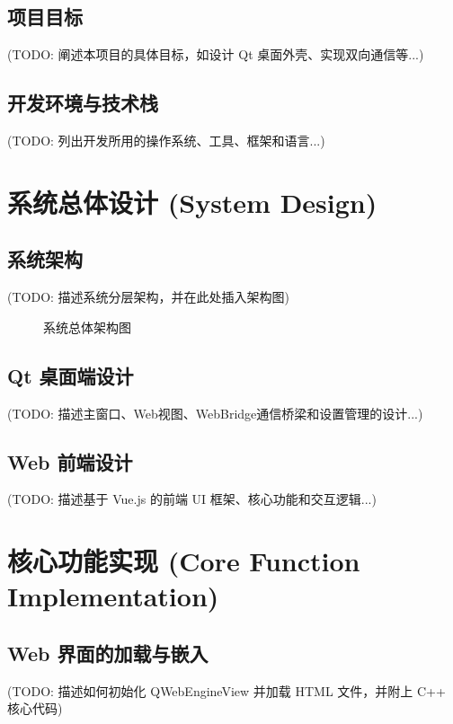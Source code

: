 \documentclass[12pt, a4paper]{article}
\begin{document}
	\subsection{项目目标}
	(TODO: 阐述本项目的具体目标，如设计 Qt 桌面外壳、实现双向通信等...)
	\subsection{开发环境与技术栈}
	(TODO: 列出开发所用的操作系统、工具、框架和语言...)
	
	\section{系统总体设计 (System Design)}
	\subsection{系统架构}
	(TODO: 描述系统分层架构，并在此处插入架构图)
	\begin{figure}[h]
		\centering
		\caption{系统总体架构图}
		\label{fig:arch}
	\end{figure}
	\subsection{Qt 桌面端设计}
	(TODO: 描述主窗口、Web视图、WebBridge通信桥梁和设置管理的设计...)
	\subsection{Web 前端设计}
	(TODO: 描述基于 Vue.js 的前端 UI 框架、核心功能和交互逻辑...)
	
	\section{核心功能实现 (Core Function Implementation)}
	\subsection{Web 界面的加载与嵌入}
	(TODO: 描述如何初始化 QWebEngineView 并加载 HTML 文件，并附上 C++ 核心代码)
	\begin{lstlisting}[style=cpp_style, caption={QWebEngineView 初始化与加载}, label={code:webview}]
	\end{lstlisting}
	
\end{document}
